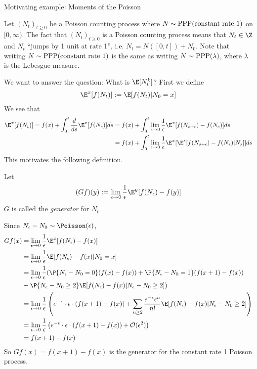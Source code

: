 \begin{exmp}{Motivating example: Moments of the Poisson}

Let $(N_t)_{t \geq 0}$ be a Poisson counting process where $N \sim \operatorname{PPP}(\text{constant rate 1})$ on $[0, \infty)$. 
The fact that  $(N_t)_{t \geq 0}$ is a Poisson counting process means that
$N_t \in \Z$ and $N_t$ ``jumps by 1 unit at rate 1'', i.e. $N_t = N([0, t]) + N_0$. 
Note that writing $N \sim \operatorname{PPP}(\text{constant rate 1})$ is the same as writing $N \sim \operatorname{PPP}(\lambda)$, where $\lambda$
is the Lebesgue measure. 

We want to answer the question: What is $\E[N_t^k]$? First we define
$$\begin{aligned}
\E^x[f(N_t)] := \E[f(N_t) | N_0 = x ] 
\end{aligned}$$
We see that
\begin{align}
\E^x[f(N_t)] = f(x) + \int_0^t \frac{d}{ds} \E^x [f(N_s)] ds &= f(x) + \int_0^t  \lim_{\epsilon \to 0} \frac{1}{\epsilon} \E^x [f(N_{s+\epsilon}) - f(N_s)] ds\\
\label{condexp1}
&=  f(x) + \int_0^t  \lim_{\epsilon \to 0}   \frac{1}{\epsilon} \E^x [ \E^s [f(N_{s+\epsilon}) - f(N_s) | N_s] ] ds
\end{align}
This motivates the following definition.
\begin{defn} Let
$$\begin{aligned}
(Gf)(y) := \lim_{\epsilon \to 0} \frac{1}{\epsilon} \E^{y}[ f(N_\epsilon) - f(y) ] 
\end{aligned}$$
$G$ is called the {\em generator} for $N_t$. 
\end{defn}


Since $N_\epsilon - N_0 \sim \Poisson(\epsilon)$, 
$$\begin{aligned}
Gf(x) &= \lim_{\epsilon \to 0} \frac{1}{\epsilon} \E^{x} [f(N_\epsilon) - f(x)] \\
& =   \lim_{\epsilon \to 0} \frac{1}{\epsilon} \E[f(N_\epsilon) - f(x) | N_0 = x] \\
& =   \lim_{\epsilon \to 0}  \frac{1}{\epsilon} ( \P \{ N_\epsilon - N_0 = 0 \} ( f(x) - f(x) ) +
\P \{ N_\epsilon - N_0 = 1 \} ( f(x+1) - f(x) )  \\
 & + \P \{ N_\epsilon - N_0 \geq 2 \} \E[f(N_\epsilon) - f(x) | N_\epsilon - N_0 \geq 2 ] )\\
& =   \lim_{\epsilon \to 0}  \frac{1}{\epsilon}  \left( e^{-\epsilon} \cdot \epsilon \cdot (f(x+1) - f(x)) + \sum_{n \geq 2} \dfrac{e^{-\epsilon} \epsilon^n}{n!}\E[f(N_\epsilon) - f(x) | N_\epsilon - N_0 \geq 2 ]  \right) \\
& =   \lim_{\epsilon \to 0}  \frac{1}{\epsilon}  \left( e^{-\epsilon} \cdot \epsilon \cdot (f(x+1) - f(x)) + \mathcal{O}(\epsilon^2) \right) \\
& =  f(x+1) - f(x)
 \end{aligned}$$
 So $Gf(x) = f(x + 1) - f(x)$ is the generator for the constant rate 1 Poisson process. 
 

\end{exmp}
